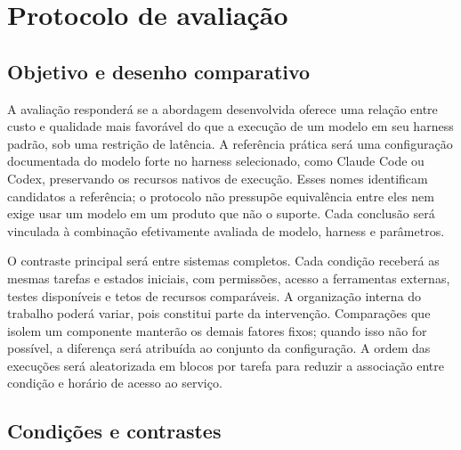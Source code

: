 \section{Protocolo de avaliação}
\label{sec:protocolo}

\subsection{Objetivo e desenho comparativo}

A avaliação responderá se a abordagem desenvolvida oferece uma relação entre custo e qualidade mais favorável do que a execução de um modelo em seu harness padrão, sob uma restrição de latência. A referência prática será uma configuração documentada do modelo forte no harness selecionado, como Claude Code ou Codex, preservando os recursos nativos de execução. Esses nomes identificam candidatos a referência; o protocolo não pressupõe equivalência entre eles nem exige usar um modelo em um produto que não o suporte. Cada conclusão será vinculada à combinação efetivamente avaliada de modelo, harness e parâmetros.

O contraste principal será entre sistemas completos. Cada condição receberá as mesmas tarefas e estados iniciais, com permissões, acesso a ferramentas externas, testes disponíveis e tetos de recursos comparáveis. A organização interna do trabalho poderá variar, pois constitui parte da intervenção. Comparações que isolem um componente manterão os demais fatores fixos; quando isso não for possível, a diferença será atribuída ao conjunto da configuração. A ordem das execuções será aleatorizada em blocos por tarefa para reduzir a associação entre condição e horário de acesso ao serviço.

\subsection{Condições e contrastes}

